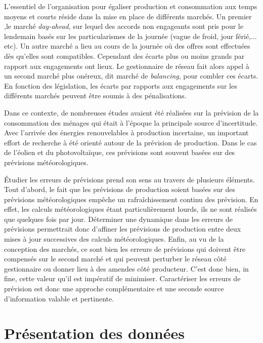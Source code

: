 \documentclass[12pt]{report}
\begin{document}
L'essentiel de l'organisation pour égaliser production et consommation aux temps moyens et courts réside dans la mise en place de différents marchés. Un premier ,le marché \textit{day-ahead}, sur lequel des accords non engageants sont pris pour le lendemain basés sur les particularismes de la journée (vague de froid, jour férié,... etc). Un autre marché a lieu au cours de la journée où des offres sont effectuées dès qu'elles sont compatibles. Cependant des écarts plus ou moins grands par rapport aux engagements ont lieux. Le gestionnaire de réseau fait alors appel à un second marché plus onéreux, dit marché de \textit{balancing}, pour combler ces écarts. En fonction des législation, les écarts par rapports aux engagements sur les différents marchés peuvent être soumis à des pénalisations.

Dans ce contexte, de nombreuses études avaient été réalisées sur la prévision de la consommation des ménages qui était à l'époque la principale source d'incertitude. Avec l'arrivée des énergies renouvelables à production incertaine, un important effort de recherche à été orienté autour de la prévision de production. Dans le cas de l'éolien et du photovoltaïque, ces prévisions sont souvent basées sur des prévisions météorologiques.

Étudier les erreurs de prévisions prend son sens au travers de plusieurs éléments. Tout d'abord, le fait que les prévisions de production soient basées sur des prévisions météorologiques empêche un rafraîchissement continu des prévision. En effet, les calculs météorologiques étant particulièrement lourds, ils ne sont réalisés que quelques fois par jour. Déterminer une dynamique dans les erreurs de prévisions permettrait donc d'affiner les prévisions de production entre deux mises à jour successives des calculs météorologiques. Enfin, au vu de la conception des marchés, ce sont bien les erreurs de prévisions qui doivent être compensés sur le second marché et qui peuvent perturber le réseau côté gestionnaire ou donner lieu à des amendes côté producteur. C'est donc bien, in fine, cette valeur qu'il est impératif de minimiser. Caractériser les erreurs de prévision est donc une approche complémentaire et une seconde source d'information valable et pertinente.  



\chapter{Présentation des données}
\end{document}
